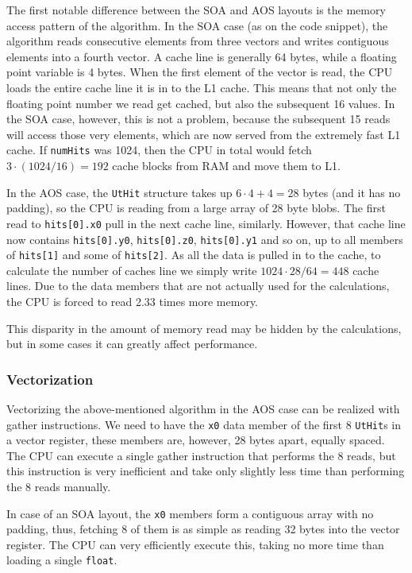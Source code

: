 \documentclass[12pt]{article}
\newcommand{\code}[1]{\texttt{#1}}
\begin{document}
The first notable difference between the SOA and AOS layouts is the memory access pattern of the algorithm. In the SOA case (as on the code snippet), the algorithm reads consecutive elements from three vectors and writes contiguous elements into a fourth vector. A cache line is generally 64 bytes, while a floating point variable is 4 bytes. When the first element of the vector is read, the CPU loads the entire cache line it is in to the L1 cache. This means that not only the floating point number we read get cached, but also the subsequent 16 values. In the SOA case, however, this is not a problem, because the subsequent 15 reads will access those very elements, which are now served from the extremely fast L1 cache. If \code{numHits} was 1024, then the CPU in total would fetch $3 \cdot (1024/16) = 192$ cache blocks from RAM and move them to L1.

In the AOS case, the \code{UtHit} structure takes up $6 \cdot 4 + 4 = 28$ bytes (and it has no padding), so the CPU is reading from a large array of 28 byte blobs. The first read to \code{hits[0].x0} pull in the next cache line, similarly. However, that cache line now contains \code{hits[0].y0}, \code{hits[0].z0}, \code{hits[0].y1} and so on, up to all members of \code{hits[1]} and some of \code{hits[2]}. As all the data is pulled in to the cache, to calculate the number of caches line we simply write $1024 \cdot 28 / 64 = 448$ cache lines. Due to the data members that are not actually used for the calculations, the CPU is forced to read 2.33 times more memory.

This disparity in the amount of memory read may be hidden by the calculations, but in some cases it can greatly affect performance.


\subsubsection{Vectorization}

Vectorizing the above-mentioned algorithm in the AOS case can be realized with gather instructions. We need to have the \code{x0} data member of the first 8 \code{UtHit}s in a vector register, these members are, however, 28 bytes apart, equally spaced. The CPU can execute a single gather instruction that performs the 8 reads, but this instruction is very inefficient and take only slightly less time than performing the 8 reads manually.

In case of an SOA layout, the \code{x0} members form a contiguous array with no padding, thus, fetching 8 of them is as simple as reading 32 bytes into the vector register. The CPU can very efficiently execute this, taking no more time than loading a single \code{float}.
\end{document}
